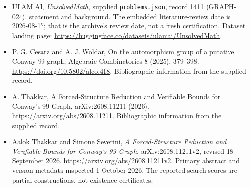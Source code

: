 \documentclass[11pt,a4paper]{article}
\begin{document}
{\small

\begin{itemize}

\item[\hypertarget{source:1411:1}{S1}] ULAM.AI, \emph{UnsolvedMath}, supplied \texttt{problems.json}, record 1411 (GRAPH-024), statement and background. The embedded literature-review date is 2026-08-17; that is the archive’s review date, not a fresh certification. Dataset landing page: \url{https://huggingface.co/datasets/ulamai/UnsolvedMath}.

\item[\hypertarget{source:1411:2}{S2}] P. G. Cesarz and A. J. Woldar, On the automorphism group of a putative Conway 99-graph, Algebraic Combinatorics 8 (2025), 379–398. \url{https://doi.org/10.5802/alco.418}. Bibliographic information from the supplied record.

\item[\hypertarget{source:1411:3}{S3}] A. Thakkar, A Forced-Structure Reduction and Verifiable Bounds for Conway's 99-Graph, arXiv:2608.11211 (2026). \url{https://arxiv.org/abs/2608.11211}. Bibliographic information from the supplied record.


\item[E1] Aalok Thakkar and Simone Severini,
\emph{A Forced-Structure Reduction and Verifiable Bounds for Conway's
99-Graph}, arXiv:2608.11211v2, revised 18 September 2026.
\url{https://arxiv.org/abs/2608.11211v2}. Primary abstract and version
metadata inspected 1 October 2026. The reported search scores are
partial constructions, not existence certificates.

\end{itemize}

}

\label{end:1411}
\end{document}

